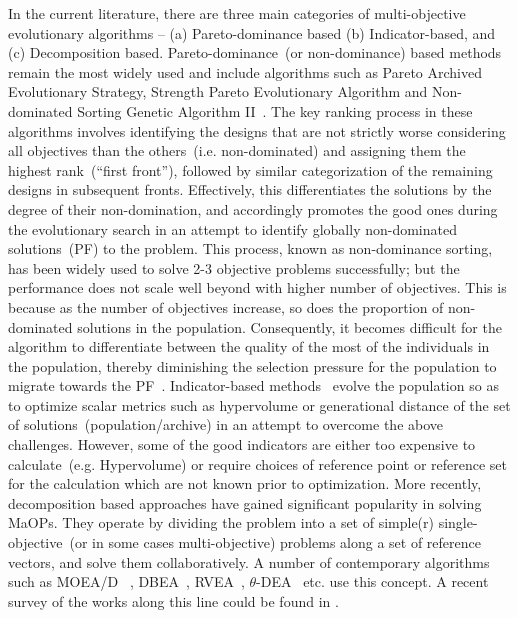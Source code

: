 In the current literature, there are three main categories of multi-objective evolutionary algorithms -- (a) Pareto-dominance based (b) Indicator-based, and (c) Decomposition based.  Pareto-dominance~(or non-dominance) based methods remain the most widely used and include algorithms such as Pareto Archived Evolutionary Strategy, Strength Pareto Evolutionary Algorithm and Non-dominated Sorting Genetic Algorithm II~\cite{deb2001multi}. {\color{blue}The key ranking process in these algorithms involves identifying the designs that are not strictly worse considering all objectives than the others~(i.e. non-dominated) and assigning them the highest rank~(``first front''), followed by similar categorization of the remaining designs in subsequent fronts. Effectively, this differentiates the solutions by the degree of their non-domination, and accordingly promotes the good ones during the evolutionary search in an attempt to identify globally non-dominated solutions~(PF) to the problem. This process, known as non-dominance sorting, has been widely used to solve 2-3 objective problems successfully; but the performance does not scale well beyond with higher number of objectives. This is because as the number of objectives increase, so does the proportion of non-dominated solutions in the population. Consequently, it becomes difficult for the algorithm to differentiate between the quality of the most of the individuals in the population, thereby diminishing the selection pressure for the population to migrate towards the PF~\cite{KHTishibuchi2008evolutionary,KHTli2015many}}. Indicator-based methods~\cite{zitzler2004indicator} evolve the population so as to optimize scalar metrics such as hypervolume or generational distance of the set of solutions~(population/archive) in an attempt to overcome the above challenges. However, some of the good indicators are either too expensive to calculate~(e.g. Hypervolume) or require choices of reference point or reference set for the calculation which are not known prior to optimization. More recently, decomposition based approaches have gained significant popularity in solving MaOPs. They operate by dividing the problem into a set of simple(r) single-objective~(or in some cases multi-objective) problems along a set of reference vectors, and solve them collaboratively. A number of contemporary algorithms such as MOEA/D~ \cite{KHTzhang2007moead}, DBEA~\cite{Asafuddoula2015}, RVEA~\cite{KHTCheng2016many}, $\theta$-DEA~\cite{KHTYuan2016many} etc. use this concept. A recent survey of the works along this line could be found in \cite{KHTtrivedisurvey}. 

